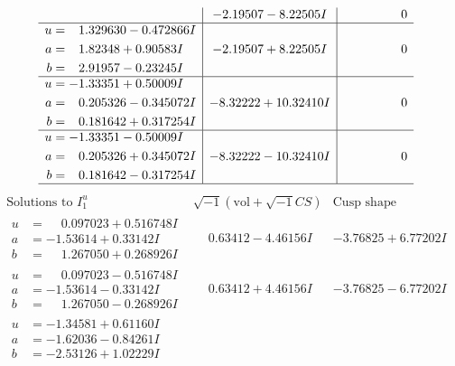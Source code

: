 \documentclass[1p]{elsarticle_modified}
\theoremstyle{definition}
\newcommand{\I}{\sqrt{-1}}
\begin{document}
$$\begin{array}{c|c|c}
 & -2.19507 - 8.22505 I & \phantom{-0.000000 } 0 \\ \hline\begin{aligned}
u &= \phantom{-}1.329630 - 0.472866 I \\
a &= \phantom{-}1.82348 + 0.90583 I \\
b &= \phantom{-}2.91957 - 0.23245 I\end{aligned}
 & -2.19507 + 8.22505 I & \phantom{-0.000000 } 0 \\ \hline\begin{aligned}
u &= -1.33351 + 0.50009 I \\
a &= \phantom{-}0.205326 - 0.345072 I \\
b &= \phantom{-}0.181642 + 0.317254 I\end{aligned}
 & -8.32222 + 10.32410 I & \phantom{-0.000000 } 0 \\ \hline\begin{aligned}
u &= -1.33351 - 0.50009 I \\
a &= \phantom{-}0.205326 + 0.345072 I \\
b &= \phantom{-}0.181642 - 0.317254 I\end{aligned}
 & -8.32222 - 10.32410 I & \phantom{-0.000000 } 0\\
 \hline 
 \end{array}$$\newpage$$\begin{array}{c|c|c}  
\text{Solutions to }I^u_{1}& \I (\text{vol} + \sqrt{-1}CS) & \text{Cusp shape}\\
 \hline 
\begin{aligned}
u &= \phantom{-}0.097023 + 0.516748 I \\
a &= -1.53614 + 0.33142 I \\
b &= \phantom{-}1.267050 + 0.268926 I\end{aligned}
 & \phantom{-}0.63412 - 4.46156 I & -3.76825 + 6.77202 I \\ \hline\begin{aligned}
u &= \phantom{-}0.097023 - 0.516748 I \\
a &= -1.53614 - 0.33142 I \\
b &= \phantom{-}1.267050 - 0.268926 I\end{aligned}
 & \phantom{-}0.63412 + 4.46156 I & -3.76825 - 6.77202 I \\ \hline\begin{aligned}
u &= -1.34581 + 0.61160 I \\
a &= -1.62036 - 0.84261 I \\
b &= -2.53126 + 1.02229 I\end{aligned}

\end{array}$$
\end{document}
